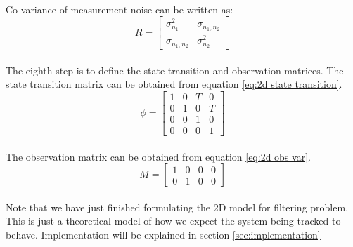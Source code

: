 \documentclass[12pt]{article}
\begin{document}
\\
Co-variance of measurement noise can be written as:
\begin{equation}
R = 
\begin{bmatrix}
	\sigma^2_{n_1} & \sigma_{n_1,n_2} \\
	\sigma_{n_1,n_2} & \sigma^2_{n_2} 
\end{bmatrix}
\label{eq:2d mes co-var}
\end{equation}
\\
The eighth step is to define the state transition and observation matrices. The state transition matrix can be obtained from equation \ref{eq:2d state transition}.
\begin{equation}
\phi = 
\begin{bmatrix}
	1 & 0 & T & 0 \\
	0 & 1 & 0 & T \\
	0 & 0 & 1 & 0 \\
	0 & 0 & 0 & 1
\end{bmatrix}
\label{eq:2d state trans mat}
\end{equation}
\\
The observation matrix can be obtained from equation \ref{eq:2d obs var}.
\begin{equation}
M = 
\begin{bmatrix}
	1 & 0 & 0 & 0 \\
	0 & 1 & 0 & 0
\end{bmatrix}
\label{eq:1d state trans mat}
\end{equation}
\\
Note that we have just finished formulating the 2D model for filtering problem. This is just a theoretical model of how we expect the system being tracked to behave. Implementation will be explained in section \ref{sec:implementation}
\end{document}
